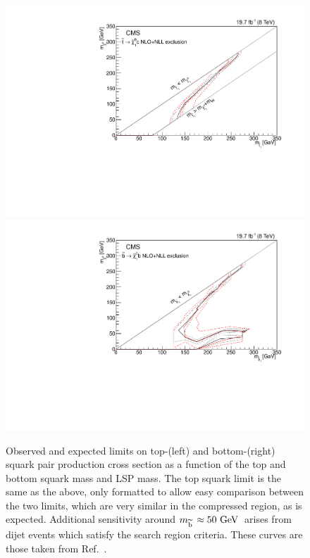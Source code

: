 \begin{figure}[!Hhtb]
  \begin{center}
  \includegraphics[scale=0.39]{Figures/sus13009/limits/mstop_lsp.pdf}
  \includegraphics[scale=0.39]{Figures/sus13009/sbottomlimits/msbottom_lsp.pdf}
  \caption{ Observed and expected limits on top-(left) and bottom-(right) squark pair production cross section as a function of the top and bottom squark mass and LSP mass. The top squark limit is the same as the above, only formatted to allow easy comparison between the two limits, which are very similar in the compressed region, as is expected. Additional sensitivity around $m_{\widetilde{{\rm b}}\,}\approx50~\mathrm{GeV}\,$ arises from dijet events which satisfy the search region criteria.
  These curves are those taken from Ref.~\cite{sus14001}.}
  \label{fig:sbottom_limits_2D}
  \end{center}
\end{figure}

